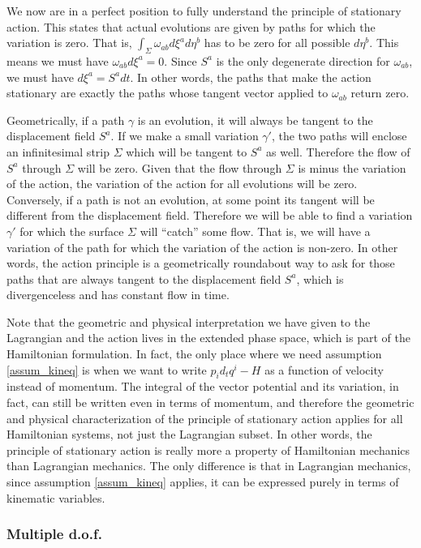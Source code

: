 We now are in a perfect position to fully understand the principle of stationary action. This states that actual evolutions are given by paths for which the variation is zero. That is, $\int_{\Sigma} \omega_{ab} d\xi^a d\eta^b$ has to be zero for all possible $d\eta^b$. This means we must have $\omega_{ab} d\xi^a = 0$. Since $S^a$ is the only degenerate direction for $\omega_{ab}$, we must have $d\xi^a = S^a dt$. In other words, the paths that make the action stationary are exactly the paths whose tangent vector applied to $\omega_{ab}$ return zero.

Geometrically, if a path $\gamma$ is an evolution, it will always be tangent to the displacement field $S^a$. If we make a small variation $\gamma'$, the two paths will enclose an infinitesimal strip $\Sigma$ which will be tangent to $S^a$ as well. Therefore the flow of $S^a$ through $\Sigma$ will be zero. Given that the flow through $\Sigma$ is minus the variation of the action, the variation of the action for all evolutions will be zero. Conversely, if a path is not an evolution, at some point its tangent will be different from the displacement field. Therefore we will be able to find a variation $\gamma'$ for which the surface $\Sigma$ will ``catch'' some flow. That is, we will have a variation of the path for which the variation of the action is non-zero. In other words, the action principle is a geometrically roundabout way to ask for those paths that are always tangent to the displacement field $S^a$, which is divergenceless and has constant flow in time.

Note that the geometric and physical interpretation we have given to the Lagrangian and the action lives in the extended phase space, which is part of the Hamiltonian formulation. In fact, the only place where we need assumption \ref{assum_kineq} is when we want to write $p_i d_t q^i - H$ as a function of velocity instead of momentum. The integral of the vector potential and its variation, in fact, can still be written even in terms of momentum, and therefore the geometric and physical characterization of the principle of stationary action applies for all Hamiltonian systems, not just the Lagrangian subset. In other words, the principle of stationary action is really more a property of Hamiltonian mechanics than Lagrangian mechanics. The only difference is that in Lagrangian mechanics, since assumption \ref{assum_kineq} applies, it can be expressed purely in terms of kinematic variables.

\subsubsection{Multiple d.o.f.}

